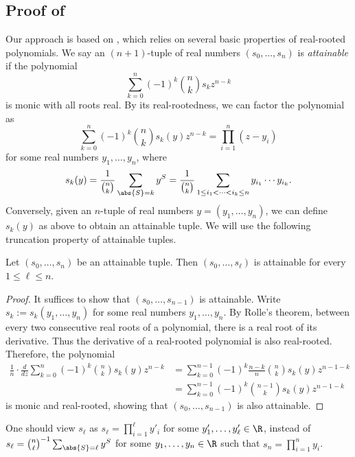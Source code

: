 \subsection{Proof of }
Our approach is based on \cite{Tao23-Maclaurin}, which relies on several basic properties of real-rooted polynomials.
We say an $(n+1)$-tuple of real numbers $(s_0, \ldots, s_n)$ is \emph{attainable} if the polynomial
\[
  \sum_{k=0}^n (-1)^k \binom{n}{k} s_k z^{n-k}
\]
is monic with all roots real.
By its real-rootedness, we can factor the polynomial as
\[
  \sum_{k=0}^n (-1)^k \binom{n}{k} s_k(y) z^{n-k}
  = \prod_{i=1}^n (z-y_i)
\]
for some real numbers $y_1, \ldots, y_n$, where
\[
  s_k(y)
  = \frac{1}{\binom{n}{k}} \sum_{\abs{S}=k} y^S
  = \frac{1}{\binom{n}{k}} \sum_{1 \le i_1 < \cdots < i_k \le n} y_{i_1} \cdots y_{i_k} .
\]
Conversely, given an $n$-tuple of real numbers $y = (y_1, \ldots, y_n)$, we can define $s_k(y)$ as above to obtain an attainable tuple.
We will use the following truncation property of attainable tuples.

\begin{fact}[Truncation] \label{fact:truncation}
  Let $(s_0, \ldots, s_n)$ be an attainable tuple.
  Then $(s_0, \ldots, s_\ell)$ is attainable for every $1 \le \ell \le n$.
\end{fact}
\begin{proof}
  It suffices to show that $(s_0, \ldots, s_{n-1})$ is attainable.
  Write $s_k := s_k(y_1, \ldots, y_n)$ for some real numbers $y_1, \dots, y_n$.
  By Rolle's theorem, between every two consecutive real roots of a polynomial, there is a real root of its derivative.
  Thus the derivative of a real-rooted polynomial is also real-rooted.
  Therefore, the polynomial
  \begin{align*}
    \frac{1}{n} \cdot \frac{d}{dz} \sum_{k=0}^n (-1)^k \binom{n}{k} s_k(y) z^{n-k}
    &= \sum_{k=0}^{n-1} (-1)^k \frac{n-k}{n} \binom{n}{k} s_k(y) z^{n-1-k} \\
    &= \sum_{k=0}^{n-1} (-1)^k \binom{n-1}{k} s_k(y) z^{n-1-k}
  \end{align*}
  is monic and real-rooted, showing that $(s_0, \ldots, s_{n-1})$ is also attainable.
\end{proof}

\begin{remark}
  One should view $s_\ell$ as $s_\ell = \prod_{i=1}^\ell y'_i$ for some $y'_1, \ldots, y'_\ell \in \R$, instead of $s_\ell = \binom{n}{\ell}^{-1} \sum_{\abs{S}=\ell} y^S$ for some $y_1, \ldots, y_n \in \R$ such that $s_n = \prod_{i=1}^n y_i$.
\end{remark}

